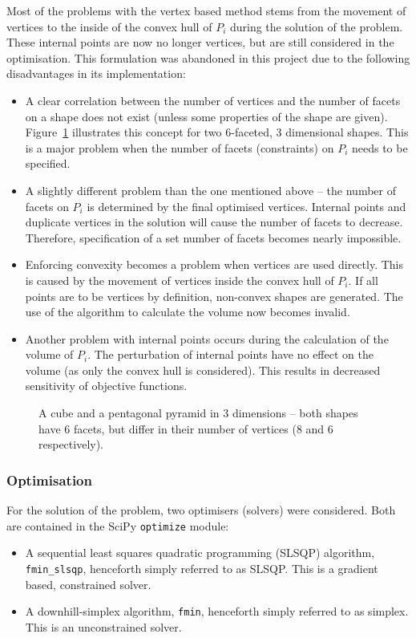 Most of the problems with the vertex based method stems from the movement of vertices to the inside of the convex hull of $P_i$ during the solution of the problem.
These internal points are now no longer vertices, but are still considered in the optimisation.
This formulation was abandoned in this project due to the following disadvantages in its implementation:
\begin{itemize}
  \item A clear correlation between the number of vertices and the number of facets on a shape does not exist (unless some properties of the shape are given).
Figure~\ref{fig:vertsvsfaces} illustrates this concept for two 6-faceted, 3 dimensional shapes.
This is a major problem when the number of facets (constraints) on $P_i$ needs to be specified.
  \item A slightly different problem than the one mentioned above -- the number of facets on $P_i$ is determined by the final optimised vertices.
Internal points and duplicate vertices in the solution will cause the number of facets to decrease.
Therefore, specification of a set number of facets becomes nearly impossible.
  \item Enforcing convexity becomes a problem when vertices are used directly.
This is caused by the movement of vertices inside the convex hull of $P_i$.
If all points are to be vertices by definition, non-convex shapes are generated.
The use of the \qhull algorithm to calculate the volume now becomes invalid. 
  \item Another problem with internal points occurs during the calculation of the volume of $P_i$.
The perturbation of internal points have no effect on the volume (as only the convex hull is considered).
This results in decreased sensitivity of objective functions.
\end{itemize}

\begin{figure}[htbp]
  \centering
  \scalebox{1.5}{}  
  \caption[The unclear correlation between number of facets and vertices]{A cube and a pentagonal pyramid in 3 dimensions -- both shapes have 6 facets, but differ in their number of vertices (8 and 6  respectively).}
  \label{fig:vertsvsfaces}
\end{figure}

\subsubsection{Optimisation}
For the solution of the problem, two optimisers (solvers) were considered.
Both are contained in the SciPy \texttt{optimize} module:
\begin{itemize}
  \item A sequential least squares quadratic programming (SLSQP) algorithm, \texttt{fmin\_slsqp}, henceforth simply referred to as SLSQP. 
This is a gradient based, constrained solver.
  \item A downhill-simplex algorithm, \texttt{fmin}, henceforth simply referred to as simplex.
This is an unconstrained solver.
\end{itemize}

